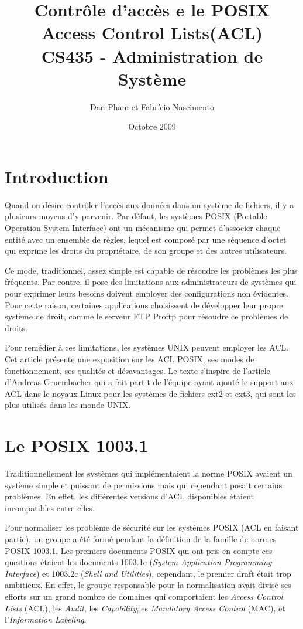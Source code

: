 \documentclass{article}
\title{\textbf{Contrôle d'accès e le POSIX Access Control Lists(ACL)} \\ CS435 - Administration de Système }
\author{Dan Pham et Fabrício Nascimento}
\date{Octobre 2009}
\begin{document}
\maketitle
\newpage

\tableofcontents
\newpage

\section{Introduction}
Quand on désire contrôler l'accès aux données dans un système de fichiers, il y a plusieurs moyens d’y parvenir. Par défaut, les systèmes POSIX (Portable Operation System Interface)\cite{ieee1,ieee2} ont un mécanisme qui permet d’associer chaque entité avec un ensemble de règles, lequel est composé par une séquence d'octet qui exprime les droits du propriétaire, de son groupe et des autres utilisateurs.

Ce mode, traditionnel, assez simple est capable de résoudre les problèmes les plus fréquents. Par contre, il pose des limitations aux administrateurs de systèmes qui pour exprimer leurs besoins doivent employer des configurations non évidentes. Pour cette raison, certaines applications choisissent de développer leur propre système de droit, comme le serveur FTP Proftp\cite{ftp} pour résoudre ce problèmes de droits.

Pour remédier à ces limitations, les systèmes UNIX peuvent employer les ACL. Cet article présente une exposition sur les ACL POSIX, ses modes de fonctionnement, ses qualités et désavantages. Le texte s’inspire de l'article d’Andreas Gruembacher\cite{aclsuse} qui a fait partit de l’équipe ayant ajouté le support aux ACL dans le noyaux Linux pour les systèmes de fichiers ext2 et ext3, qui sont les plus utilisés dans les monde UNIX.

\section{Le POSIX 1003.1}
 
Traditionnellement les systèmes qui implémentaient la norme POSIX avaient un système simple et puissant de permissions mais qui cependant posait certains problèmes. En effet, les différentes versions d'ACL disponibles étaient incompatibles entre elles.
 
Pour normaliser les problème de sécurité sur les systèmes POSIX (ACL en faisant partie), un groupe a été formé pendant la définition de la famille de normes POSIX 1003.1. Les premiers documents POSIX qui ont pris en compte ces questions étaient les documents 1003.1e (\emph{System Application Programming Interface}) et 1003.2c (\emph{Shell and Utilities}), cependant, le premier draft était trop ambitieux. En effet, le groupe responsable pour la normalisation avait divisé ses efforts sur un grand nombre de domaines qui comportaient les \emph{Access Control Lists} (ACL), les \emph{Audit}, les \emph{Capability},les \emph{ Mandatory Access Control }(MAC), et l'\emph{Information Labeling}\cite{aclsuse}.
 
\end{document}
